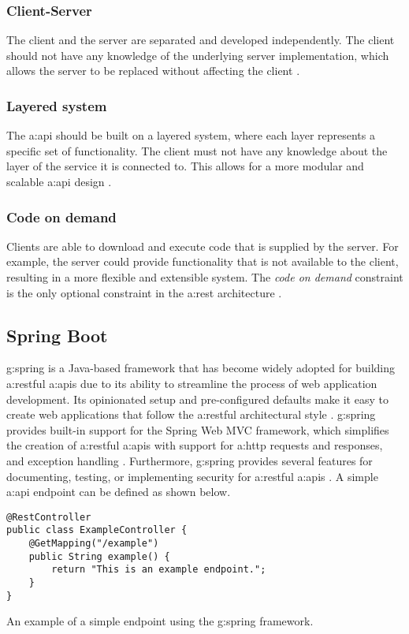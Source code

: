 \subsubsection{Client-Server}
The client and the server are separated and developed independently. The client should not have any knowledge of the underlying server implementation, which allows the server to be replaced without affecting the client \cite{RESTGuidelines}.
\subsubsection{Layered system}
The \gls{a:api} should be built on a layered system, where each layer represents a specific set of functionality. The client must not have any knowledge about the layer of the service it is connected to. This allows for a more modular and scalable \gls{a:api} design \cite{RESTGuidelines}.
\subsubsection{Code on demand}
Clients are able to download and execute code that is supplied by the server. For example, the server could provide functionality that is not available to the client, resulting in a more flexible and extensible system. The \textit{code on demand} constraint is the only optional constraint in the \gls{a:rest} architecture \cite{RESTGuidelines}.

\subsection{Spring Boot}
\Gls{g:spring} is a Java-based framework that has become widely adopted for building \gls{a:rest}ful \glspl{a:api} due to its ability to streamline the process of web application development. Its opinionated setup and pre-configured defaults make it easy to create web applications that follow the \gls{a:rest}ful architectural style \cite{SpringBoot}. \Gls{g:spring} provides built-in support for the Spring Web MVC framework, which simplifies the creation of \gls{a:rest}ful \glspl{a:api} with support for \gls{a:http} requests and responses, and exception handling \cite{SpringMvc}. Furthermore, \gls{g:spring} provides several features for documenting, testing, or implementing security for \gls{a:rest}ful \glspl{a:api} \cite{SpringFramework}. A simple \gls{a:api} endpoint can be defined as shown below.

\begin{listing}[H]
\begin{verbatim}
@RestController
public class ExampleController {
    @GetMapping("/example")
    public String example() {
        return "This is an example endpoint.";
    }
}
\end{verbatim}
\vspace{-.6cm}
\caption{An example of a simple endpoint using the \gls{g:spring} framework.}
\label{lst:spring-example}
\end{listing}
\vspace{-.3cm}

